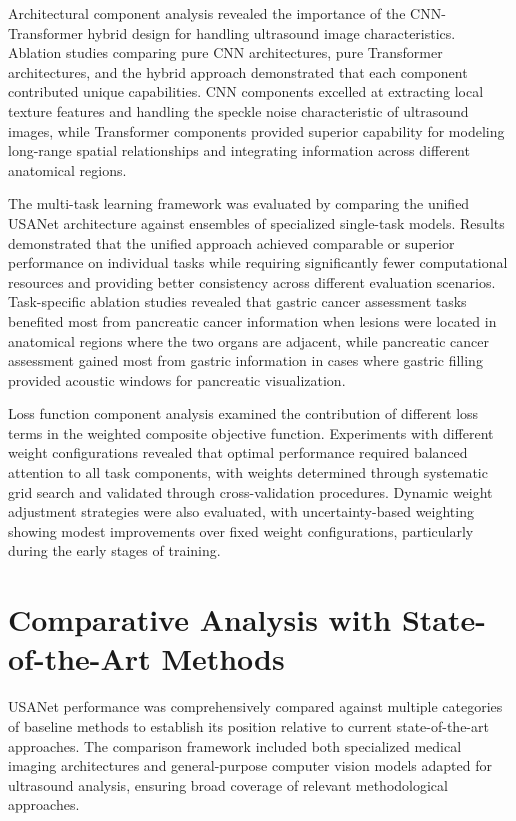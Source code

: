 Architectural component analysis revealed the importance of the CNN-Transformer hybrid design for handling ultrasound image characteristics. Ablation studies comparing pure CNN architectures, pure Transformer architectures, and the hybrid approach demonstrated that each component contributed unique capabilities. CNN components excelled at extracting local texture features and handling the speckle noise characteristic of ultrasound images, while Transformer components provided superior capability for modeling long-range spatial relationships and integrating information across different anatomical regions.

The multi-task learning framework was evaluated by comparing the unified USANet architecture against ensembles of specialized single-task models. Results demonstrated that the unified approach achieved comparable or superior performance on individual tasks while requiring significantly fewer computational resources and providing better consistency across different evaluation scenarios. Task-specific ablation studies revealed that gastric cancer assessment tasks benefited most from pancreatic cancer information when lesions were located in anatomical regions where the two organs are adjacent, while pancreatic cancer assessment gained most from gastric information in cases where gastric filling provided acoustic windows for pancreatic visualization.

Loss function component analysis examined the contribution of different loss terms in the weighted composite objective function. Experiments with different weight configurations revealed that optimal performance required balanced attention to all task components, with weights determined through systematic grid search and validated through cross-validation procedures. Dynamic weight adjustment strategies were also evaluated, with uncertainty-based weighting showing modest improvements over fixed weight configurations, particularly during the early stages of training.

\section{Comparative Analysis with State-of-the-Art Methods}

USANet performance was comprehensively compared against multiple categories of baseline methods to establish its position relative to current state-of-the-art approaches. The comparison framework included both specialized medical imaging architectures and general-purpose computer vision models adapted for ultrasound analysis, ensuring broad coverage of relevant methodological approaches.

